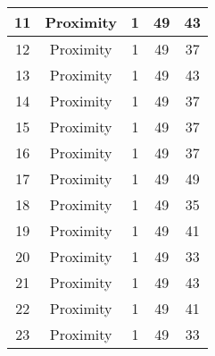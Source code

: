 \documentclass[results.tex]{subfiles}
\begin{document}
\begin{center}
\begin{tabular}{| c || c | c | c | c |}
            \hline
            11                      & Proximity                    & 1                      & 49                      & 43                   \\
            \hline
            12                      & Proximity                    & 1                      & 49                      & 37                   \\
            \hline
            13                      & Proximity                    & 1                      & 49                      & 43                   \\
            \hline
            14                      & Proximity                    & 1                      & 49                      & 37                   \\
            \hline
            15                      & Proximity                    & 1                      & 49                      & 37                   \\
            \hline
            16                      & Proximity                    & 1                      & 49                      & 37                   \\
            \hline
            17                      & Proximity                    & 1                      & 49                      & 49                   \\
            \hline
            18                      & Proximity                    & 1                      & 49                      & 35                   \\
            \hline
            19                      & Proximity                    & 1                      & 49                      & 41                   \\
            \hline
            20                      & Proximity                    & 1                      & 49                      & 33                   \\
            \hline
            21                      & Proximity                    & 1                      & 49                      & 43                   \\
            \hline
            22                      & Proximity                    & 1                      & 49                      & 41                   \\
            \hline
            23                      & Proximity                    & 1                      & 49                      & 33                   \\

\end{tabular}
\end{center}
\end{document}
